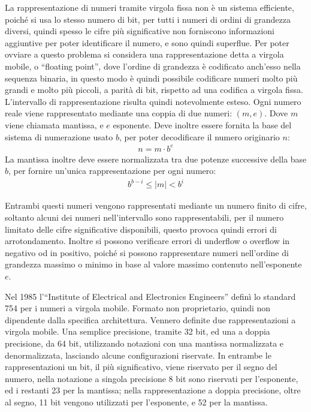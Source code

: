 \documentclass{article}
\numberwithin{equation}{subsection}
\begin{document}
La rappresentazione di numeri tramite virgola fissa non è un sistema efficiente, poiché si usa lo stesso numero di bit, per tutti i numeri di ordini di grandezza diversi, quindi spesso le cifre più significative 
non forniscono informazioni aggiuntive per poter identificare il numero, e sono quindi superflue. Per poter ovviare a questo problema si considera una rappresentazione detta a virgola mobile, o ``floating point'', 
dove l'ordine di grandezza è codificato anch'esso nella sequenza binaria, in questo modo è quindi possibile codificare numeri molto più grandi e molto più piccoli, a parità di bit, rispetto ad una codifica a virgola 
fissa. L'intervallo di rappresentazione risulta quindi notevolmente esteso. 
Ogni numero reale viene rappresentato mediante una coppia di due numeri: $(m, e)$. Dove $m$ viene chiamata mantissa, e $e$ esponente. Deve inoltre essere fornita la base del sistema di numerazione usato $b$, per poter 
decodificare il numero originario $n$: 
\begin{gather*}
    n=m\cdot b^e
\end{gather*}
La mantissa inoltre deve essere normalizzata tra due potenze successive della base $b$, per fornire un'unica rappresentazione per ogni numero:
\begin{gather*}
    b^{b-i}\leq|m|<b^i
\end{gather*}

Entrambi questi numeri vengono rappresentati mediante un numero finito di cifre, soltanto alcuni dei numeri nell'intervallo sono rappresentabili, per il numero limitato delle cifre significative disponibili, questo 
provoca quindi errori di arrotondamento. Inoltre si possono verificare errori di underflow o overflow in negativo od in positivo, poiché si possono rappresentare numeri nell'ordine di grandezza massimo o minimo 
in base al valore massimo contenuto nell'esponente $e$. 

Nel 1985 l'``Institute of Electrical and Electronics Engineers'' definì lo standard 754 per i numeri a virgola mobile. Formato non proprietario, quindi non dipendente dalla specifica architettura. 
Vennero definite due rappresentazioni a virgola mobile. Una semplice precisione, tramite 32 bit, ed una a doppia precisione, da 64 bit, utilizzando notazioni con una mantissa normalizzata e denormalizzata, lasciando 
alcune configurazioni riservate. 
In entrambe le rappresentazioni un bit, il più significativo, viene riservato per il segno del numero, nella notazione a singola precisione 8 bit sono riservati per l'esponente, ed i restanti 23 per la mantissa; 
nella rappresentazione a doppia precisione, oltre al segno, 11 bit vengono utilizzati per l'esponente, e 52 per la mantissa. 
\end{document}
